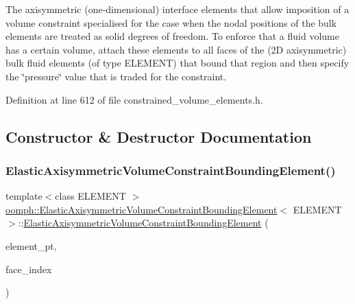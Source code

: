 The axisymmetric (one-\/dimensional) interface elements that allow imposition of a volume constraint specialised for the case when the nodal positions of the bulk elements are treated as solid degrees of freedom. To enforce that a fluid volume has a certain volume, attach these elements to all faces of the (2D axisymmetric) bulk fluid elements (of type E\+L\+E\+M\+E\+NT) that bound that region and then specify the \char`\"{}pressure\char`\"{} value that is traded for the constraint. 

Definition at line 612 of file constrained\+\_\+volume\+\_\+elements.\+h.



\subsection{Constructor \& Destructor Documentation}
\mbox{\label{classoomph_1_1ElasticAxisymmetricVolumeConstraintBoundingElement_a533376e1f314fabc4c014f9c7547f5e8}} 
\subsubsection{\texorpdfstring{Elastic\+Axisymmetric\+Volume\+Constraint\+Bounding\+Element()}{ElasticAxisymmetricVolumeConstraintBoundingElement()}}
{\footnotesize\ttfamily template$<$class E\+L\+E\+M\+E\+NT $>$ \\
\hyperlink{classoomph_1_1ElasticAxisymmetricVolumeConstraintBoundingElement}{oomph\+::\+Elastic\+Axisymmetric\+Volume\+Constraint\+Bounding\+Element}$<$ E\+L\+E\+M\+E\+NT $>$\+::\hyperlink{classoomph_1_1ElasticAxisymmetricVolumeConstraintBoundingElement}{Elastic\+Axisymmetric\+Volume\+Constraint\+Bounding\+Element} (\begin{DoxyParamCaption}\item[{\hyperlink{classoomph_1_1FiniteElement}{Finite\+Element} $\ast$const \&}]{element\+\_\+pt,  }\item[{const int \&}]{face\+\_\+index }\end{DoxyParamCaption})\hspace{0.3cm}{\ttfamily [inline]}}



